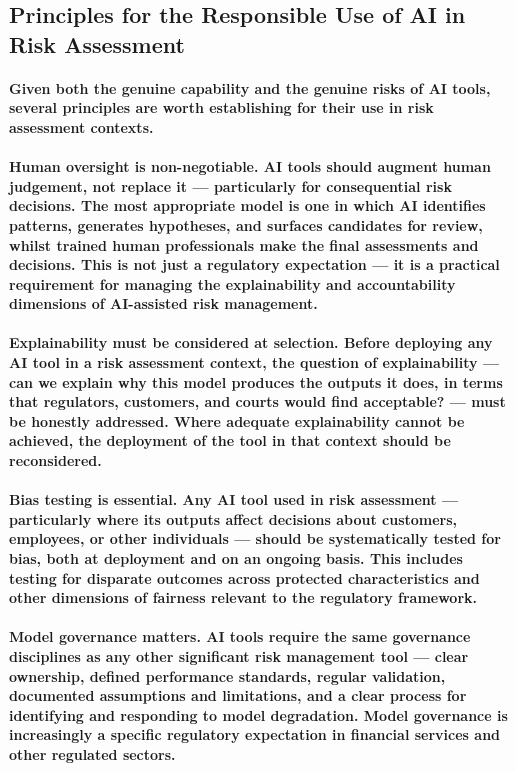 \subsection{Principles for the Responsible Use of AI in Risk Assessment}
\paragraph{Given both the genuine capability and the genuine risks of AI tools, several principles are worth establishing for their use in risk assessment contexts.}
\paragraph{\textbf{Human oversight is non-negotiable}. AI tools should augment human judgement, not replace it — particularly for consequential risk decisions. The most appropriate model is one in which AI identifies patterns, generates hypotheses, and surfaces candidates for review, whilst trained human professionals make the final assessments and decisions. This is not just a regulatory expectation — it is a practical requirement for managing the explainability and accountability dimensions of AI-assisted risk management.}
\paragraph{\textbf{Explainability must be considered at selection}. Before deploying any AI tool in a risk assessment context, the question of explainability — can we explain why this model produces the outputs it does, in terms that regulators, customers, and courts would find acceptable? — must be honestly addressed. Where adequate explainability cannot be achieved, the deployment of the tool in that context should be reconsidered.}
\paragraph{\textbf{Bias testing is essential. Any AI tool used in risk assessment — particularly where its outputs affect decisions about customers, employees, or other individuals — should be systematically tested for bias, both at deployment and on an ongoing basis. This includes testing for disparate outcomes across protected characteristics and other dimensions of fairness relevant to the regulatory framework.}}
\paragraph{\textbf{Model governance matters}. AI tools require the same governance disciplines as any other significant risk management tool — clear ownership, defined performance standards, regular validation, documented assumptions and limitations, and a clear process for identifying and responding to model degradation. Model governance is increasingly a specific regulatory expectation in financial services and other regulated sectors.}

